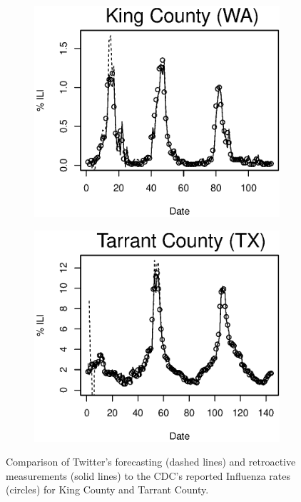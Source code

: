 \begin{figure}
\centering
\begin{subfigure}[b]{0.49\textwidth}
	\includegraphics[width=\textwidth]{longitude/figs/nowcastLocal_seattle.eps}
\end{subfigure}
\begin{subfigure}[b]{0.49\textwidth}
	\includegraphics[width=\textwidth]{longitude/figs/nowcastLocal_texas.eps}
\end{subfigure}
\caption{Comparison of Twitter's forecasting (dashed lines) and retroactive measurements (solid lines) to the CDC's reported Influenza rates (circles) for King County and Tarrant County.}
\label{fig:local_curves_all}
\end{figure}